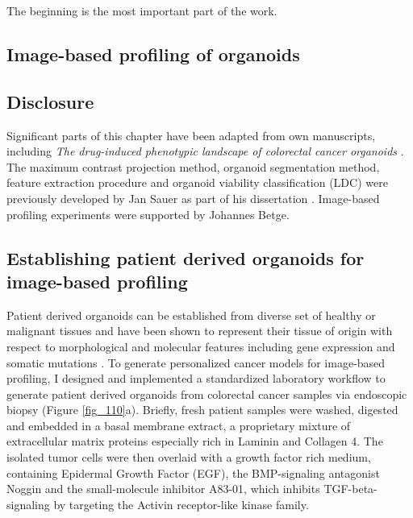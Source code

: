 \begin{savequote}[75mm]
The beginning is the most important part of the work.
\end{savequote}

\begin{flushleft}
\chapter{Image-based profiling of organoids}

\section{Disclosure}
Significant parts of this chapter have been adapted from own manuscripts, including \textit{The drug-induced phenotypic landscape of colorectal cancer organoids} \cite{Betge2022-kr}. The maximum contrast projection method, organoid segmentation method, feature extraction procedure and organoid viability classification (LDC) were previously developed by Jan Sauer as part of his dissertation \cite{noauthor_undated-ij}. Image-based profiling experiments were supported by Johannes Betge. 

\section{Establishing patient derived organoids for image-based profiling}

Patient derived organoids can be established from diverse set of healthy or malignant tissues and have been shown to represent their tissue of origin with respect to morphological and molecular features including gene expression and somatic mutations \cite{Fujii2016-ax, Weeber2015-sn, Van_De_Wetering2015-ko, Sato2011-lh,  Broutier2017-wg}. To generate personalized cancer models for image-based profiling, I designed and implemented a standardized laboratory workflow to generate patient derived organoids from colorectal cancer samples via endoscopic biopsy (Figure \ref{fig_110}a). Briefly, fresh patient samples were washed, digested and embedded in a basal membrane extract, a proprietary mixture of extracellular matrix proteins especially rich in Laminin and Collagen 4. The isolated tumor cells were then overlaid with a growth factor rich medium, containing Epidermal Growth Factor (EGF), the BMP-signaling antagonist Noggin and the small-molecule inhibitor A83-01, which inhibits TGF-beta-signaling by targeting the Activin receptor-like kinase family.


\end{flushleft}
